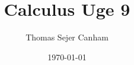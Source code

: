\documentclass{article}
\title{Calculus Uge 9}
\author{Thomas Sejer Canham}
\date{\today}
\begin{document}
\begin{titlepage}
 \maketitle
 \thispagestyle{empty}
\end{titlepage}
\end{document}
